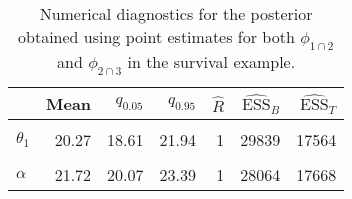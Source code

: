 \begin{table}

\caption{Numerical diagnostics for the posterior obtained using point estimates for both $\phi_{1 \cap 2}$ and $\phi_{2 \cap 3}$ in the survival example.}
\centering
\begin{tabular}[t]{lrrrrrr}
\toprule
  & Mean & $q_{0.05}$ & $q_{0.95}$ & $\widehat{R}$ & $\widehat{\text{ESS}}_{B}$ & $\widehat{\text{ESS}}_{T}$\\
\midrule
\cellcolor{gray!6}{$\theta_{0}$} & \cellcolor{gray!6}{7.32} & \cellcolor{gray!6}{5.68} & \cellcolor{gray!6}{8.94} & \cellcolor{gray!6}{1} & \cellcolor{gray!6}{28643} & \cellcolor{gray!6}{17851}\\
$\theta_{1}$ & 20.27 & 18.61 & 21.94 & 1 & 29839 & 17564\\
\cellcolor{gray!6}{$\gamma$} & \cellcolor{gray!6}{10.73} & \cellcolor{gray!6}{9.82} & \cellcolor{gray!6}{11.68} & \cellcolor{gray!6}{1} & \cellcolor{gray!6}{27592} & \cellcolor{gray!6}{17292}\\
$\alpha$ & 21.72 & 20.07 & 23.39 & 1 & 28064 & 17668\\
\bottomrule
\end{tabular}
\end{table}
